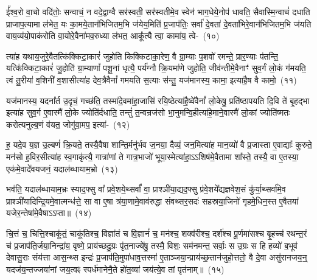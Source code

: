 ई᳚श्व॒रो वा॒चो वदि॑तोः॒ सन्वाचं॒ न वदे॒द्वाग्वै सर॑स्वती॒ सर॑स्वतीमे॒व स्वेन॑ भाग॒धेये॒नोप॑ धावति॒ सैवास्मि॒न्वाचं॑ दधाति प्राजाप॒त्यामा ल॑भेत॒ यः का॒मये॒तान॑भिजितम॒भि ज॑येय॒मिति॑ प्र॒जा\-प॑तिः॒ सर्वा॑ दे॒वता॑ दे॒वता॑भिरे॒वान॑भि\-जितम॒भि ज॑यति वाय॒व्य॑यो॒पा\-क॑रोति वा॒योरे॒वैना॑मव॒रुध्या ल॑भत॒ आकू᳚त्यै त्वा॒ कामा॑य॒ त्वे-~(१०)

त्या॑ह यथाय॒जुरे॒वैतत्कि॑क्किटा॒कारं॑ जुहोति किक्किटाका॒रेण॒ वै ग्रा॒म्याः प॒शवो॑ रमन्ते॒ प्रार॒ण्याः प॑तन्ति॒ यत्कि॑क्किटा॒कारं॑ जु॒होति॑ ग्रा॒म्याणां᳚ पशू॒नां धृत्यै॒ पर्य॑ग्नौ क्रि॒यमा॑णे जुहोति॒ जीव॑न्तीमे॒वैनाꣳ॑ सुव॒र्गं लो॒कं ग॑मयति॒ त्वं तु॒रीया॑ व॒शिनी॑ व॒शासीत्या॑ह देव॒त्रैवैनां᳚ गमयति स॒त्याः स॑न्तु॒ यज॑मानस्य॒ कामा॒ इत्या॑है॒ष वै कामो॒~(११)

यज॑मानस्य॒ यदना᳚र्त उ॒दृचं॒ गच्छ॑ति॒ तस्मा॑दे॒वमा॑हा॒जासि॑ रयि॒ष्ठेत्या॑है॒ष्वे॑वैनां᳚ लो॒केषु॒ प्रति॑\-ष्ठापयति दि॒वि ते॑ बृ॒हद्भा इत्या॑ह सुव॒र्ग ए॒वास्मै॑ लो॒के ज्योति॑र्दधाति॒ तन्तुं॑ त॒न्वन्रज॑सो भा॒नुमन्वि॒ही\-त्या॑\-हे॒माने॒वास्मै॑ लो॒कां ज्योति॑ष्मतः करोत्यनुल्ब॒णं व॑यत॒ जोगु॑वा॒मप॒ इत्या॑-~(१२)

ह॒ यदे॒व य॒ज्ञ उ॒ल्बणं॑ क्रि॒यते॒ तस्यै॒वैषा शान्ति॒र्मनु॑र्भव ज॒नया॒ दैव्यं॒ जन॒मित्या॑ह मान॒व्यो॑ वै प्र॒जास्ता ए॒वाद्याः᳚ कुरुते॒ मन॑सो ह॒विर॒सीत्या॑ह स्व॒गाकृ॑त्यै॒ गात्रा॑णां ते गात्र॒भाजो॑ भूया॒स्मेत्या॑हा॒\-ऽऽ\-शिष॑मे॒वैतामा शा᳚स्ते॒ तस्यै॒ वा ए॒तस्या॒ एक॑मे॒वादे॑वयजनं॒ यदाल॑ब्धायाम॒भ्रो~(१३)

भव॑ति॒ यदाल॑ब्धायाम॒भ्रः स्याद॒फ्सु वा᳚ प्रवे॒शये॒थ्सर्वां᳚ वा॒ प्राश्ञी॑या॒द्यद॒फ्सु प्र॑वे॒शये᳚द्यज्ञवेश॒सं कु॑र्या॒थ्सर्वा॑मे॒व प्राश्ञी॑यादिन्द्रि॒यमे॒वात्मन्ध॑त्ते॒ सा वा ए॒षा त्र॑या॒णामे॒वाव॑रुद्धा संवथ्सर॒सदः॑ सहस्रया॒जिनो॑ गृहमे॒धिन॒स्त ए॒वैतया॑ यजेर॒न्तेषा॑\-मे॒वै\-षाऽऽप्ता॥~(१४)

{\anuvakamend[{यथ्स्वेन॑ सारस्व॒तीमा ल॑भेत॒ यः कामा॑य त्वा॒ कामो\-ऽप॒ इत्य॒भ्रो द्विच॑त्वारिꣳशच्च}]}%

चि॒त्तं च॒ चित्ति॒श्चाकू॑तं॒ चाकू॑तिश्च॒ विज्ञा॑तं च वि॒ज्ञानं॑ च॒ मन॑श्च॒ शक्व॑रीश्च॒ दर्\mbox{}श॑श्च पू॒र्णमा॑सश्च बृ॒हच्च॑ रथन्त॒रं च॑ प्र॒जा\-प॑ति॒र्जया॒निन्द्रा॑य॒ वृष्णे॒ प्राय॑च्छदु॒ग्रः पृ॑त॒नाज्ये॑षु॒ तस्मै॒ विशः॒ सम॑नमन्त॒ सर्वाः॒ स उ॒ग्रः स हि हव्यो॑ ब॒भूव॑ देवासु॒राः संय॑त्ता आस॒न्थ्स इन्द्रः॑ प्र॒जा\-प॑ति॒मुपा॑धाव॒त्तस्मा॑ ए॒ताञ्जया॒न्प्राय॑च्छ॒त्तान॑जुहो॒त्ततो॒ वै दे॒वा असु॑रानजय॒न्॒ य\-दज॑य॒न्तज्जया॑नां जय॒त्वꣴ स्पर्ध॑मानेनै॒ते हो॑त॒व्या॑ जय॑त्ये॒व तां पृत॑नाम्॥~(१५)

{\anuvakamend[{उप॒ पञ्च॑विꣳशतिश्च}]}%

